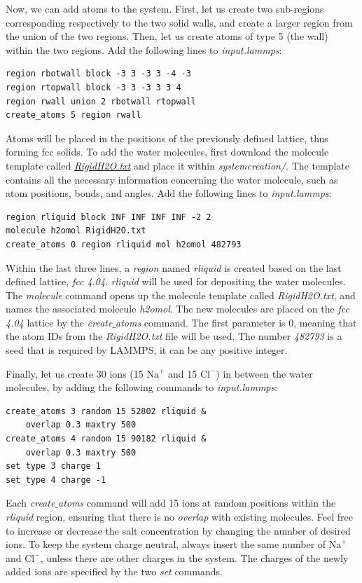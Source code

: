 \documentclass[9pt,tutorial]{livecoms}
\begin{document}
Now, we can add atoms to the system. First, let us create two sub-regions corresponding respectively to the two solid walls, and create a larger region from the union of the two regions. Then, let us create atoms of type 5 (the wall) within the two regions. Add the following lines to \textit{input.lammps}:
{\normalsize \begin{verbatim}
region rbotwall block -3 3 -3 3 -4 -3
region rtopwall block -3 3 -3 3 3 4
region rwall union 2 rbotwall rtopwall
create_atoms 5 region rwall
\end{verbatim}}
Atoms will be placed in the positions of the previously defined lattice, thus forming fcc solids. To add the water molecules, first download the molecule template called \href{https://raw.githubusercontent.com/lammpstutorials/lammpstutorials-article/main/files/tutorial4/RigidH2O.txt}{\textit{RigidH2O.txt}} and place it within \textit{systemcreation/}. The template contains all the
necessary information concerning the water molecule, such as atom positions, bonds, and angles. Add the following lines to \textit{input.lammps}:
{\normalsize \begin{verbatim}
region rliquid block INF INF INF INF -2 2
molecule h2omol RigidH2O.txt
create_atoms 0 region rliquid mol h2omol 482793
\end{verbatim}}
Within the last three lines, a \textit{region} named \textit{rliquid} is created based on the last defined lattice, \textit{fcc 4.04}. \textit{rliquid} will be used for depositing the water molecules. The \textit{molecule} command opens up the molecule template called \textit{RigidH2O.txt}, and names the associated molecule \textit{h2omol}. The new molecules are placed on the \textit{fcc 4.04} lattice by the \textit{create$\_$atoms} command. The first parameter is 0, meaning that the atom IDs from the \textit{RigidH2O.txt} file will be used. The number \textit{482793} is a seed that is required by LAMMPS, it can be any positive integer.

Finally, let us create 30 ions (15 $\text{Na}^+$ and 15 $\text{Cl}^-$) in between the water molecules, by adding the following commands to \textit{input.lammps}:
{\normalsize \begin{verbatim}
create_atoms 3 random 15 52802 rliquid &
    overlap 0.3 maxtry 500
create_atoms 4 random 15 90182 rliquid &
    overlap 0.3 maxtry 500
set type 3 charge 1
set type 4 charge -1
\end{verbatim}}
Each \textit{create$\_$atoms} command will add 15 ions at random positions within the \textit{rliquid} region, ensuring that there is no \textit{overlap} with existing molecules. Feel free to increase or decrease the salt concentration by changing the number of desired ions. To keep the system charge neutral, always insert the same number of $\text{Na}^+$ and $\text{Cl}^-$, unless there are other charges in the system. The charges of the newly added ions are specified by the two \textit{set} commands.
\end{document}
